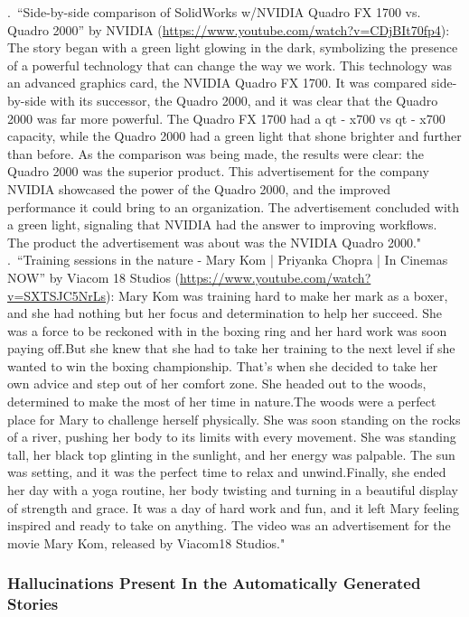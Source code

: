 \documentclass[hidelinks,11pt,a4paper]{report}
\begin{document}
    .~``Side-by-side comparison of SolidWorks w/NVIDIA Quadro FX 1700 vs. Quadro 2000'' by NVIDIA (\url{https://www.youtube.com/watch?v=CDjBIt70fp4}): The story began with a green light glowing in the dark, symbolizing the presence of a powerful technology that can change the way we work. This technology was an advanced graphics card, the NVIDIA Quadro FX 1700. It was compared side-by-side with its successor, the Quadro 2000, and it was clear that the Quadro 2000 was far more powerful. The Quadro FX 1700 had a qt - x700 vs qt - x700 capacity, while the Quadro 2000 had a green light that shone brighter and further than before. As the comparison was being made, the results were clear: the Quadro 2000 was the superior product. This advertisement for the company NVIDIA showcased the power of the Quadro 2000, and the improved performance it could bring to an organization. The advertisement concluded with a green light, signaling that NVIDIA had the answer to improving workflows. The product the advertisement was about was the NVIDIA Quadro 2000." \\

    

    .~``Training sessions in the nature - Mary Kom | Priyanka Chopra | In Cinemas NOW'' by Viacom 18 Studios (\url{https://www.youtube.com/watch?v=SXTSJC5NrLs}): Mary Kom was training hard to make her mark as a boxer, and she had nothing but her focus and determination to help her succeed. She was a force to be reckoned with in the boxing ring and her hard work was soon paying off.But she knew that she had to take her training to the next level if she wanted to win the boxing championship. That's when she decided to take her own advice and step out of her comfort zone. She headed out to the woods, determined to make the most of her time in nature.The woods were a perfect place for Mary to challenge herself physically. She was soon standing on the rocks of a river, pushing her body to its limits with every movement. She was standing tall, her black top glinting in the sunlight, and her energy was palpable. The sun was setting, and it was the perfect time to relax and unwind.Finally, she ended her day with a yoga routine, her body twisting and turning in a beautiful display of strength and grace. It was a day of hard work and fun, and it left Mary feeling inspired and ready to take on anything. The video was an advertisement for the movie Mary Kom, released by Viacom18 Studios." \\


\subsubsection{Hallucinations Present In the Automatically Generated Stories}
\end{document}
